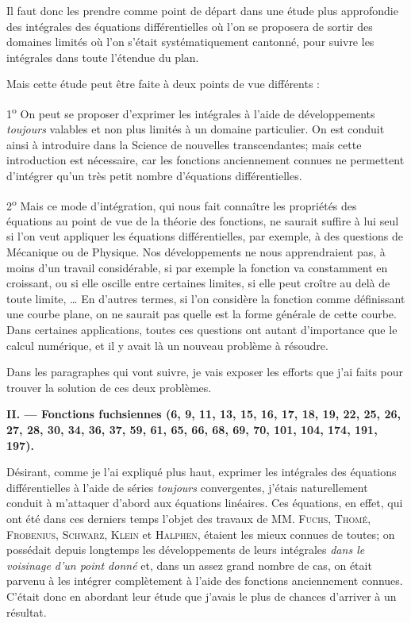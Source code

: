 \documentclass[11pt]{article}
\begin{document}
Il faut donc les prendre comme point de départ dans une étude plus approfondie des intégrales des équations différentielles où l’on se proposera de sortir des domaines limités où l’on s’était systématiquement cantonné, pour suivre les intégrales dans toute l’étendue du plan.

Mais cette étude peut être faite à deux points de vue différents :

1\textsuperscript{o} On peut se proposer d’exprimer les intégrales à l’aide de développements \emph{toujours} valables et non plus limités à un domaine particulier. On est conduit ainsi à introduire dans la Science de nouvelles transcendantes; mais cette introduction est nécessaire, car les fonctions anciennement connues ne permettent d’intégrer qu’un très petit nombre d’équations différentielles.

2\textsuperscript{o} Mais ce mode d’intégration, qui nous fait connaître les propriétés des équations au point de vue de la théorie des fonctions, ne saurait suffire à lui seul si l’on veut appliquer les équations différentielles, par exemple, à des questions de Mécanique ou de Physique. Nos développements ne nous apprendraient pas, à moins d’un travail considérable, si par exemple la fonction va constamment en croissant, ou si elle oscille entre certaines limites, si elle peut croître au delà de toute limite, \ldots{} En d’autres termes, si l’on considère la fonction comme définissant une courbe plane, on ne saurait pas quelle est la forme générale de cette courbe. Dans certaines applications, toutes ces questions ont autant d’importance que le calcul numérique, et il y avait là un nouveau problème à résoudre.

Dans les paragraphes qui vont suivre, je vais exposer les efforts que j’ai faits pour trouver la solution de ces deux problèmes.


\begin{center}
\textbf{II. — Fonctions fuchsiennes (6, 9, 11, 13, 15, 16, 17, 18, 19, 22, 25, 26, 27, 28, 30, 34, 36, 37, 59, 61, 65, 66, 68, 69, 70, 101, 104, 174, 191, 197).}
\end{center}

Désirant, comme je l’ai expliqué plus haut, exprimer les intégrales des équations différentielles à l’aide de séries \emph{toujours} convergentes, j’étais naturellement conduit à m’attaquer d’abord aux équations linéaires. Ces équations, en effet, qui ont été dans ces derniers temps l’objet des travaux de MM. \textsc{Fuchs}, \textsc{Thomé}, \textsc{Frobenius}, \textsc{Schwarz}, \textsc{Klein} et \textsc{Halphen}, étaient les mieux connues de toutes; on possédait depuis longtemps les développements de leurs intégrales \emph{dans le voisinage d’un point donné} et, dans un assez grand nombre de cas, on était parvenu à les intégrer complètement à l’aide des fonctions anciennement connues. C’était donc en abordant leur étude que j’avais le plus de chances d’arriver à un résultat.
\end{document}
